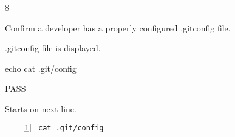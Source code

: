 \begin{description}[align=right,leftmargin=3.2cm,labelindent=3.0cm]
\item[Step:] 8
\item[Confirm:] Confirm a developer has a properly configured .gitconfig file.
\item[Expectation:] .gitconfig file is displayed.
\item[Command:] echo cat  .git/config
\item[Test Result:] PASS
\item[Evidence:] Starts on next line.
\end{description}
\begin{lstlisting}[numbers=left]
cat .git/config

\end{lstlisting}
